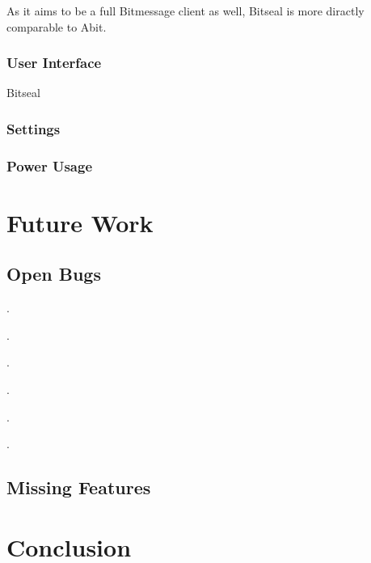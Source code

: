 \documentclass{bfh}
\begin{document}
  As it aims to be a full Bitmessage client as well, Bitseal is more diractly comparable to Abit.

  \subsubsection{User Interface}
  Bitseal 

  \subsubsection{Settings}
  \subsubsection{Power Usage}





  \newpage
  \section{Future Work}
  \subsection{Open Bugs}
.

.

.

.

.

.

  \subsection{Missing Features}



  \newpage
  \section{Conclusion}
  












  \newpage
  
  
\end{document}
